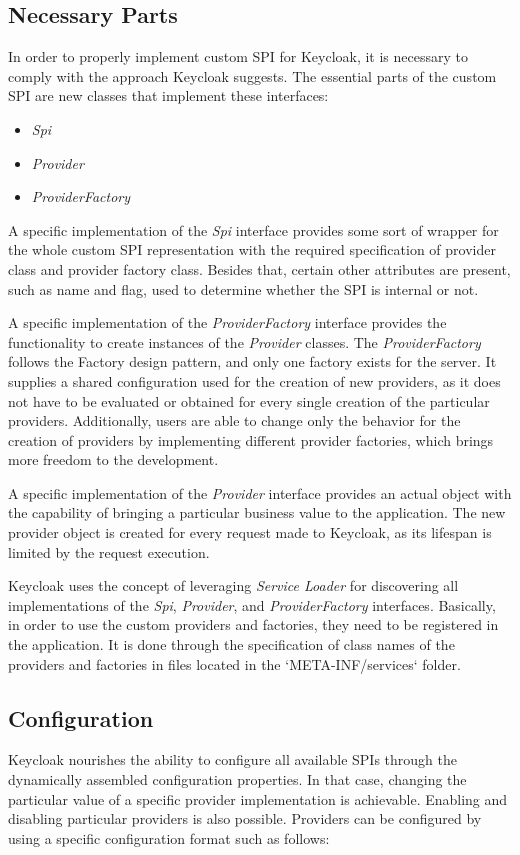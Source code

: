 \subsection{Necessary Parts}
In order to properly implement custom SPI for Keycloak, it is necessary to comply with the approach Keycloak suggests.
The essential parts of the custom SPI are new classes that implement these interfaces:
\begin{itemize}
    \item \textit{Spi}
    \item \textit{Provider}
    \item \textit{ProviderFactory}
\end{itemize}

A specific implementation of the \textit{Spi} interface provides some sort of wrapper for the whole custom SPI representation with the required specification of provider class and provider factory class.
Besides that, certain other attributes are present, such as name and flag, used to determine whether the SPI is internal or not.

A specific implementation of the \textit{ProviderFactory} interface provides the functionality to create instances of the \textit{Provider} classes.
The \textit{ProviderFactory} follows the Factory design pattern, and only one factory exists for the server.
It supplies a shared configuration used for the creation of new providers, as it does not have to be evaluated or obtained for every single creation of the particular providers.
Additionally, users are able to change only the behavior for the creation of providers by implementing different provider factories, which brings more freedom to the development.

A specific implementation of the \textit{Provider} interface provides an actual object with the capability of bringing a particular business value to the application.
The new provider object is created for every request made to Keycloak, as its lifespan is limited by the request execution.

Keycloak uses the concept of leveraging \textit{Service Loader} for discovering all implementations of the \textit{Spi}, \textit{Provider}, and \textit{ProviderFactory} interfaces.
Basically, in order to use the custom providers and factories, they need to be registered in the application.
It is done through the specification of class names of the providers and factories in files located in the `META-INF/services` folder.

\subsection{Configuration}
Keycloak nourishes the ability to configure all available SPIs through the dynamically assembled configuration properties.
In that case, changing the particular value of a specific provider implementation is achievable.
Enabling and disabling particular providers is also possible.\cite{keycloak-spi-config}
\newline
\newline
Providers can be configured by using a specific configuration format such as follows:

